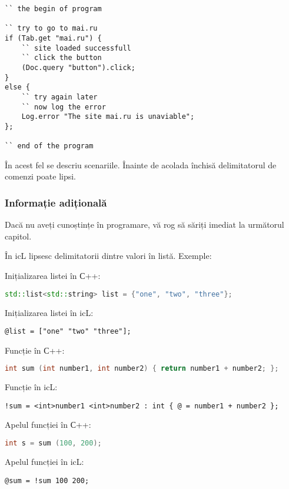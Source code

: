 \begin{lstlisting}[caption=Cod cu spații,label=readable]
`` the begin of program

`` try to go to mai.ru
if (Tab.get "mai.ru") {
	`` site loaded successfull
	`` click the button
	(Doc.query "button").click;
}
else {
	`` try again later
	`` now log the error
	Log.error "The site mai.ru is unaviable";
};

`` end of the program
\end{lstlisting}

În acest fel se descriu scenariile. Înainte de acolada închisă delimitatorul de comenzi poate lipsi.

\subsubsection{Informație adițională}

Dacă nu aveți cunoștințe în programare, vă rog să săriți imediat la următorul capitol.

În icL lipsesc delimitatorii dintre valori în listă. Exemple:

\begin{icItems}
	\item Inițializarea listei în С++:
\begin{lstlisting}[numbers=none, language=C++]
std::list<std::string> list = {"one", "two", "three"};
\end{lstlisting}
	Inițializarea listei în icL:
\begin{lstlisting}[numbers=none]
@list = ["one" "two" "three"];
\end{lstlisting}
	\item Funcție în С++:
\begin{lstlisting}[numbers=none, language=C++]
int sum (int number1, int number2) { return number1 + number2; };
\end{lstlisting}
	Funcție în icL:
\begin{lstlisting}[numbers=none]
!sum = <int>number1 <int>number2 : int { @ = number1 + number2 };
\end{lstlisting}
	\item Apelul funcției în С++:
\begin{lstlisting}[numbers=none, language=C++]
int s = sum (100, 200);
\end{lstlisting}
	Apelul funcției în icL:
\begin{lstlisting}[numbers=none]
@sum = !sum 100 200;
\end{lstlisting}
\end{icItems}
